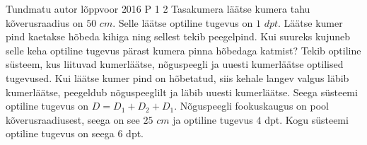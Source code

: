 {Tundmatu autor} %
{lõppvoor} %
{2016} %
{P 1} %
{2} %
{
\ifStatement
Tasakumera läätse kumera tahu kõverusraadius on $50$ $cm$. Selle läätse optiline tugevus on $1$ $dpt$. Läätse kumer pind kaetakse hõbeda kihiga ning sellest tekib peegelpind. Kui suureks kujuneb selle keha optiline tugevus pärast kumera pinna hõbedaga katmist?
\fi
\ifHint
Tekib optiline süsteem, kus liituvad kumerläätse, nõguspeegli ja uuesti kumerläätse optilised tugevused.
\fi
\ifSolution
Kui läätse kumer pind on hõbetatud, siis kehale langev valgus läbib kumerläätse, peegeldub nõguspeeglilt ja läbib uuesti kumerläätse. Seega süsteemi optiline tugevus on $D = D_1 + D_2 + D_1$. Nõguspeegli fookuskaugus on pool kõverusraadiusest, seega on see $25$ $cm$ ja optiline tugevus $4$ dpt. Kogu süsteemi optiline tugevus on seega $6$ dpt.
\fi
}
